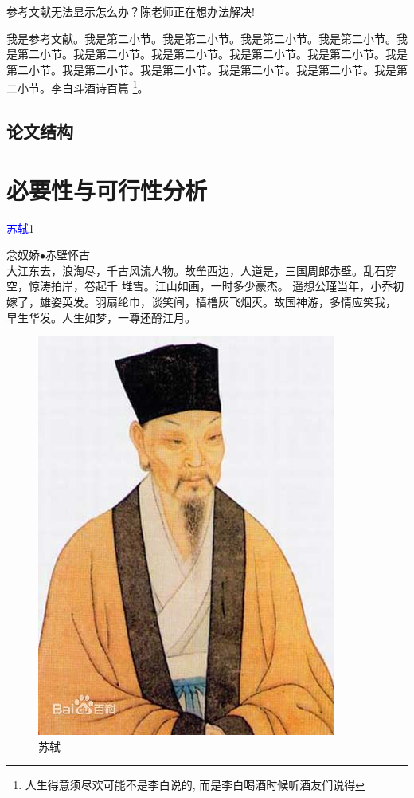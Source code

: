 \documentclass[supercite]{HustGraduPaper}
\theoremstyle{definition}
\begin{document}
参考文献无法显示怎么办？陈老师正在想办法解决\cite{STR2021Neurocom, AVS2021Neurocom}!

我是参考文献。我是第二小节\cite{Mehrabian1974An}。我是第二小节\cite{Rezaei2014CVPR}。我是第二小节\cite{Ramnath2008IJCV}。我是第二小节。我是第二小节。我是第二小节。我是第二小节。我是第二小节。我是第二小节。我是第二小节。我是第二小节。我是第二小节。我是第二小节。我是第二小节。我是第二小节。李白斗酒诗百篇 \footnote{人生得意须尽欢可能不是李白说的, 而是李白喝酒时候听酒友们说得}。

\subsection{论文结构}

\newpage

\section{必要性与可行性分析}
\textcolor{blue}{苏轼\ref{Sushi}}


念奴娇$\bullet$赤壁怀古 \\
大江东去，浪淘尽，千古风流人物。故垒西边，人道是，三国周郎赤壁。乱石穿空，惊涛拍岸，卷起千
堆雪。江山如画，一时多少豪杰。 
遥想公瑾当年，小乔初嫁了，雄姿英发。羽扇纶巾，谈笑间，樯橹灰飞烟灭。故国神游，多情应笑我，
早生华发。人生如梦，一尊还酹江月。 

\begin{figure}[ht]
	\begin{center}
		\includegraphics{Sushi.jpg}
		\caption{苏轼}
		\label{Sushi}
	\end{center}
\end{figure}
\end{document}
